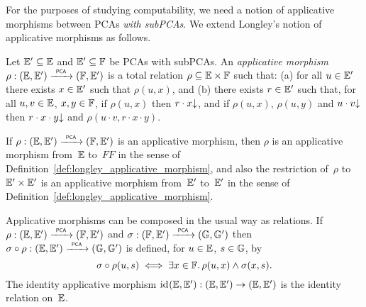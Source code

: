 For the purposes of studying computability, we need a notion of
applicative morphisms between PCAs \emph{with subPCAs}. We extend
Longley's notion of applicative morphisms as follows.

\begin{definition}
  \label{def:applicative_morphism}%
  Let ${\mathbb{E}'} \subseteq {\mathbb{E}}$ and ${\mathbb{E}'} \subseteq {\mathbb{F}}$ be PCAs with
  subPCAs. An \emph{applicative morphism} $\rho: ({\mathbb{E}}, {\mathbb{E}'})
  \xrightarrow{\scriptscriptstyle\mathsf{\ PCA\ }}{} ({\mathbb{F}}, {\mathbb{E}'})$ is a total relation $\rho \subseteq {\mathbb{E}} \times 
  {\mathbb{F}}$ such that:
  (a)
  for all $u \in {\mathbb{E}'}$ there exists $x \in {\mathbb{E}'}$ such that
  $\rho(u, x)$, and
  (b)
  there exists $r \in {\mathbb{E}'}$ such that, for all $u, v \in {\mathbb{E}}$, $x, y
  \in {\mathbb{F}}$, if $\rho(u, x)$ then $r \cdot x{\downarrow}$, and if $\rho(u,
  x)$, $\rho(u, y)$ and $u \cdot v{\downarrow}$ then $r \cdot x \cdot y{\downarrow}$ and $\rho(u \cdot v, r \cdot x \cdot y)$.
\end{definition}

If $\rho: ({\mathbb{E}}, {\mathbb{E}'}) \xrightarrow{\scriptscriptstyle\mathsf{\ PCA\ }}{} ({\mathbb{F}}, {\mathbb{E}'})$ is an applicative
morphism, then $\rho$ is an applicative morphism from~${\mathbb{E}}$ to~$FF$ in
the sense of Definition~\ref{def:longley_applicative_morphism}, and
also the restriction of~$\rho$ to ${\mathbb{E}'} \times {\mathbb{E}'}$ is an
applicative morphism from~${\mathbb{E}'}$ to~${\mathbb{E}'}$ in the sense of
Definition~\ref{def:longley_applicative_morphism}.

%
%
%
Applicative morphisms can be composed in the usual way as relations.
If $\rho: ({\mathbb{E}}, {\mathbb{E}'}) \xrightarrow{\scriptscriptstyle\mathsf{\ PCA\ }}{} ({\mathbb{F}}, {\mathbb{E}'})$ and $\sigma: ({\mathbb{F}},
{\mathbb{E}'}) \xrightarrow{\scriptscriptstyle\mathsf{\ PCA\ }}{} ({\mathbb{G}}, {\mathbb{G}'})$ then $\sigma \circ \rho: ({\mathbb{E}}, {\mathbb{E}'})
\xrightarrow{\scriptscriptstyle\mathsf{\ PCA\ }}{} ({\mathbb{G}}, {\mathbb{G}'})$ is defined, for $u \in {\mathbb{E}}$, $s \in {\mathbb{G}}$, by
%
\begin{equation*}
  \sigma \circ \rho (u, s)
  \iff
  \exists x \in {\mathbb{F}} .\,{\rho(u, x) \land \sigma(x, s)}.
\end{equation*}
%
The identity applicative morphism $\mathrm{id}_{}{({\mathbb{E}}, {\mathbb{E}'})}: ({\mathbb{E}},
{\mathbb{E}'}) \to ({\mathbb{E}}, {\mathbb{E}'})$ is the identity relation on~${\mathbb{E}}$.

